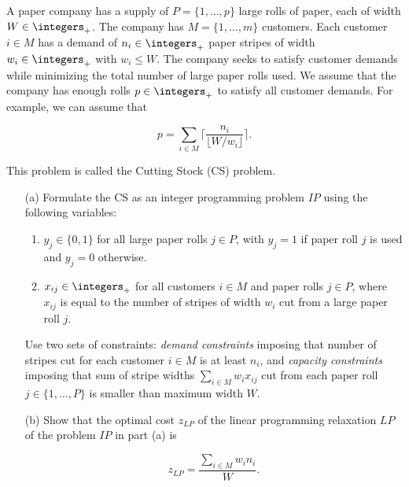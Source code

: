 A paper company has a supply of $P = \{1,\dots,p\}$ large rolls of paper, each of width $W\in \integers_+$. The company has $M = \{1,\dots,m\}$ customers. Each customer $i\in M$ has a demand of $n_i\in \integers_+$ paper stripes of width $w_i \in \integers_+$ with $w_i \leq W$. The company seeks to satisfy customer demands while minimizing the total number of large paper rolls used. We assume that the company has enough rolls $p \in \integers_+$ to satisfy all customer demands. For example, we can assume that

\[
p = \sum_{i\in M} \lceil \frac{n_i}{\lfloor W/w_i \rfloor} \rceil.
\]

This problem is called the Cutting Stock (CS) problem.

\begin{itemize}[itemsep=10pt]
\item[(a)] Formulate the CS as an integer programming problem $IP$ using the following variables:

\begin{enumerate}[itemsep=0pt]
\item $y_j\in \{0,1\}$ for all large paper rolls $j \in P$, with $y_j = 1$ if paper roll $j$ is used and \lb $y_j = 0$ otherwise.
\item $x_{ij} \in \integers_+$ for all customers $i\in M$ and paper rolls $j \in P$, where $x_{ij}$ is equal to the number of stripes of width $w_i$ cut from a large paper roll $j$.
\end{enumerate}

Use two sets of constraints: \emph{demand constraints} imposing that number of stripes cut for each customer $i\in M$ is at least $n_i$, and \emph{capacity constraints} imposing that sum of stripe widths $\sum_{i\in M} w_i x_{ij}$ cut from each paper roll $j\in \{1,\dots,P\}$ is smaller than maximum width $W$.
\item[(b)] Show that the optimal cost $z_{LP}$ of the linear programming relaxation $LP$ of the problem $IP$ in part (a) is

\[
z_{LP} = \frac{\sum_{i\in M} w_i n_i}{W}.
\]
 

\end{itemize}
